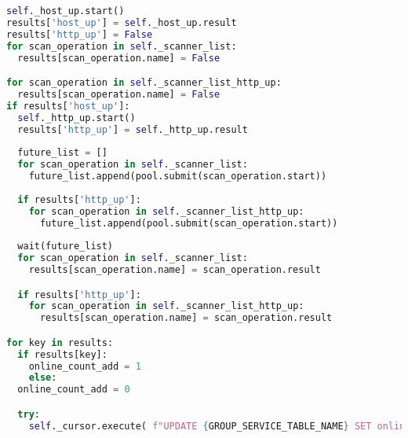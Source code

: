 \newpage
\begin{lstlisting}[language=Python, frame=single, caption={Big Brother Scanner}, captionpos=b, label={lst:bigbrother-scanner}]
self._host_up.start()
results['host_up'] = self._host_up.result
results['http_up'] = False
for scan_operation in self._scanner_list:
  results[scan_operation.name] = False

for scan_operation in self._scanner_list_http_up:
  results[scan_operation.name] = False
if results['host_up']:
  self._http_up.start()
  results['http_up'] = self._http_up.result
  
  future_list = []
  for scan_operation in self._scanner_list:
    future_list.append(pool.submit(scan_operation.start))
    
  if results['http_up']:
    for scan_operation in self._scanner_list_http_up:
      future_list.append(pool.submit(scan_operation.start))
      
  wait(future_list)
  for scan_operation in self._scanner_list:
    results[scan_operation.name] = scan_operation.result

  if results['http_up']:
    for scan_operation in self._scanner_list_http_up:
      results[scan_operation.name] = scan_operation.result

for key in results:
  if results[key]:
    online_count_add = 1
    else:
  online_count_add = 0

  try:
    self._cursor.execute( f"UPDATE {GROUP_SERVICE_TABLE_NAME} SET online_count =  online_count + {online_count_add}, scan_count =  scan_count + 1, was_online = {results[key]}, last_scan = CURRENT_TIMESTAMP WHERE group_id = {self._id} AND service_id = {self._get_id_of_scan_operation(key)}")
\end{lstlisting}